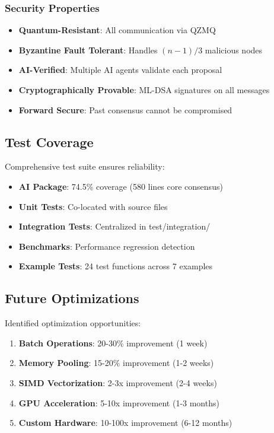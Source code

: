 \subsubsection{Security Properties}

\begin{itemize}
\item \textbf{Quantum-Resistant}: All communication via QZMQ
\item \textbf{Byzantine Fault Tolerant}: Handles $(n-1)/3$ malicious nodes
\item \textbf{AI-Verified}: Multiple AI agents validate each proposal
\item \textbf{Cryptographically Provable}: ML-DSA signatures on all messages
\item \textbf{Forward Secure}: Past consensus cannot be compromised
\end{itemize}

\subsection{Test Coverage}

Comprehensive test suite ensures reliability:

\begin{itemize}
\item \textbf{AI Package}: 74.5\% coverage (580 lines core consensus)
\item \textbf{Unit Tests}: Co-located with source files
\item \textbf{Integration Tests}: Centralized in test/integration/
\item \textbf{Benchmarks}: Performance regression detection
\item \textbf{Example Tests}: 24 test functions across 7 examples
\end{itemize}

\subsection{Future Optimizations}

Identified optimization opportunities:

\begin{enumerate}
\item \textbf{Batch Operations}: 20-30\% improvement (1 week)
\item \textbf{Memory Pooling}: 15-20\% improvement (1-2 weeks)
\item \textbf{SIMD Vectorization}: 2-3x improvement (2-4 weeks)
\item \textbf{GPU Acceleration}: 5-10x improvement (1-3 months)
\item \textbf{Custom Hardware}: 10-100x improvement (6-12 months)
\end{enumerate}

